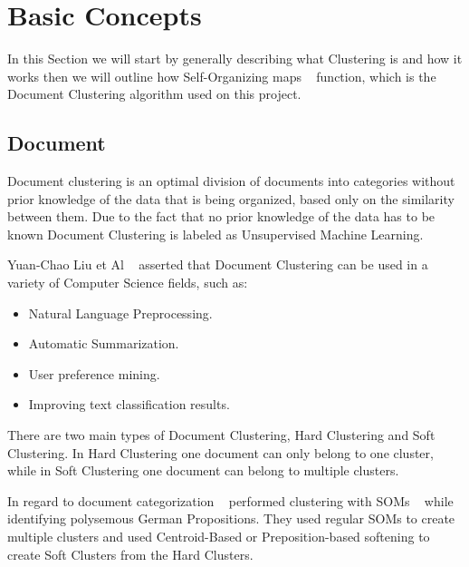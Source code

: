 \section{Basic Concepts} 
\label{sec:basic_concepts}

In this Section we will start by generally describing what Clustering is and how it works then we will outline how Self-Organizing maps ~\cite{Kohonen1990} function, which is the Document Clustering algorithm used on this project.

\subsection{Document}
\label{sub:clustering}
Document clustering is an optimal division of documents into categories without prior knowledge of the data that is being organized, based only on the similarity between them. Due to the fact that no prior knowledge of the data has to be known Document Clustering is labeled as Unsupervised Machine Learning.

Yuan-Chao Liu et Al ~\cite{Liu2012b} asserted that Document Clustering can be used in a variety of Computer Science fields, such as:
\begin{itemize}
  \item Natural Language Preprocessing.
  \item Automatic Summarization.
  \item User preference mining.
  \item Improving text classification results.
\end{itemize}

There are two main types of Document Clustering, Hard Clustering and Soft Clustering. In Hard Clustering one document can only belong to one cluster, while in Soft Clustering one document can belong to multiple clusters. 

In regard to document categorization ~\citet{Springorum1998} performed clustering with SOMs ~\citep{Kohonen1990} while identifying polysemous German Propositions. They used regular SOMs to create multiple clusters and used Centroid-Based or Preposition-based softening to create Soft Clusters from the Hard Clusters.

